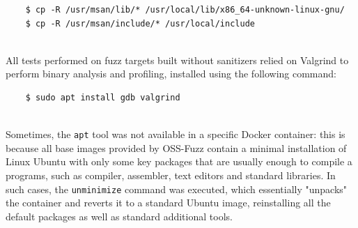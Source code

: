 \begin{verbatim}
    $ cp -R /usr/msan/lib/* /usr/local/lib/x86_64-unknown-linux-gnu/
    $ cp -R /usr/msan/include/* /usr/local/include
\end{verbatim}
\ \\
All tests performed on fuzz targets built without sanitizers relied on Valgrind to perform binary analysis and profiling, installed using the following command:\begin{verbatim}
    $ sudo apt install gdb valgrind
\end{verbatim}
\ \\
Sometimes, the \verb|apt| tool was not available in a specific Docker container: this is because all base images provided by OSS-Fuzz contain a minimal installation of Linux Ubuntu with only some key packages that are usually enough to compile a programs, such as compiler, assembler, text editors and standard libraries.
\newline
In such cases, the \verb|unminimize| command was executed, which essentially "unpacks" the container and reverts it to a standard Ubuntu image, reinstalling all the default packages as well as standard additional tools.



